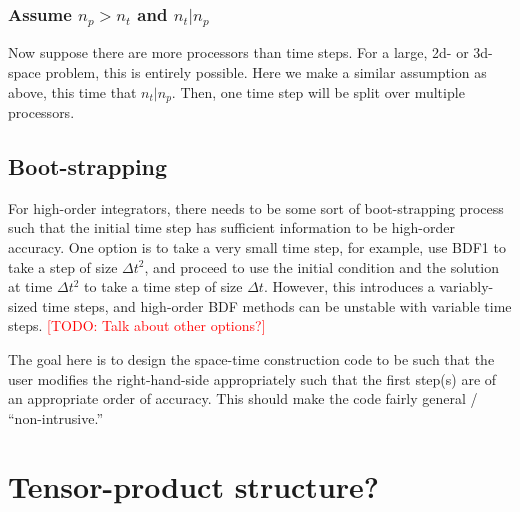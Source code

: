 \documentclass[a4paper,12pt]{article}
\makeatletter
\newcommand{\todo}[1]{\textcolor{red}{[TODO\@: #1]}}
\makeatother
\begin{document}
\subsubsection{Assume $n_p > n_t$ and $n_t | n_p$}

Now suppose there are more processors than time steps. For a large, 2d- or 3d-space problem, this is entirely possible.
Here we make a similar assumption as above, this time that $n_t | n_p$. Then, one time step will be split over multiple
processors. 


\subsection{Boot-strapping}

For high-order integrators, there needs to be some sort of boot-strapping process such that the initial time step has sufficient
information to be high-order accuracy. One option is to take a very small time step, for example, use BDF1 to take a step of
size $\Delta t^2$, and proceed to use the initial condition and the solution at time $\Delta t^2$ to take a time step of size 
$\Delta t$. However, this introduces a variably-sized time steps, and high-order BDF methods can be unstable with variable
time steps. \todo{Talk about other options?}

The goal here is to design the space-time construction code to be such that the user modifies the right-hand-side appropriately
such that the first step(s) are of an appropriate order of accuracy. This should make the code fairly general / ``non-intrusive.'' 

\section{Tensor-product structure?}
\end{document}
